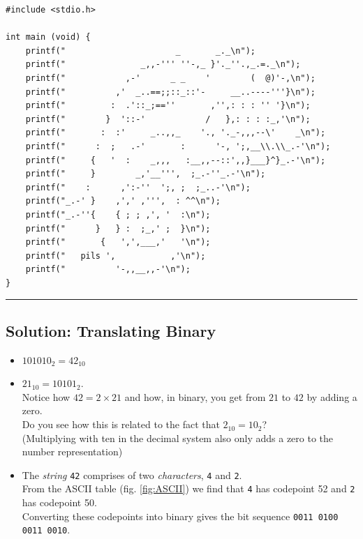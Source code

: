 \begin{codebox}[chameleon.c]
\begin{verbatim}
#include <stdio.h>

int main (void) {
	printf("                      _       _._\n");
	printf("               _,,-''' ''-,_ }'._''.,_.=._\n");
	printf("            ,-'      _ _    '        (  @)'-,\n");
	printf("          ,'  _..==;;::_::'-     __..----'''}\n");
	printf("         :  .'::_;==''       ,'',: : : '' '}\n");
	printf("        }  '::-'            /   },: : : :_,'\n");
	printf("       :  :'     _..,,_    '., '._-,,,--\'    _\n");
	printf("      :  ;   .-'       :      '-, ';,__\\.\\_.-'\n");
	printf("     {   '  :    _,,,   :__,,--::',,}___}^}_.-'\n");
	printf("     }        _,'__''',  ;_.-''_.-'\n");
	printf("    :      ,':-''  ';, ;  ;_..-'\n");
	printf("_.-' }    ,',' ,''',  : ^^\n");
	printf("_.-''{    { ; ; ,', '  :\n");
	printf("      }   } :  ;_,' ;  }\n");
	printf("       {   ',',___,'   '\n");
	printf("   pils ',           ,'\n");
	printf("          '-,,__,,-'\n");
}
\end{verbatim}
\end{codebox}

\rule{\linewidth}{0.1mm}

\subsection*{Solution: Translating Binary}
\begin{itemize}
\item $101010_2 = 42_{10}$
\item $21_{10} = 10101_2$. \\
	Notice how $42 = 2 \times 21$ and how, in binary, you get from $21$ to $42$ by adding a zero.\\
	Do you see how this is related to the fact that $2_{10} = 10_2$?\\
	(Multiplying with ten in the decimal system also only adds a zero to the number representation)
\item The \emph{string} \texttt{42} comprises of two \emph{characters}, \texttt{4} and \texttt{2}.\\
	From the ASCII table (fig. \ref{fig:ASCII}) we find that \texttt{4} has codepoint 52 and \texttt{2} has codepoint 50.\\
	Converting these codepoints into binary gives the bit sequence \texttt{0011 0100  0011 0010}.
\end{itemize}

